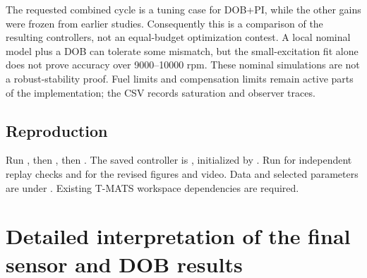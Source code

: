 The requested combined cycle is a tuning case for DOB+PI, while the other gains were frozen from earlier studies. Consequently this is a comparison of the resulting controllers, not an equal-budget optimization contest. A local nominal model plus a DOB can tolerate some mismatch, but the small-excitation fit alone does not prove accuracy over 9000--10000 rpm. These nominal simulations are not a robust-stability proof. Fuel limits and compensation limits remain active parts of the implementation; the CSV records saturation and observer traces.
\subsection{Reproduction}
Run , then , then . The saved controller is , initialized by . Run  for independent replay checks and  for the revised figures and video. Data and selected parameters are under . Existing T-MATS workspace dependencies are required.


\section{Detailed interpretation of the final sensor and DOB results}
